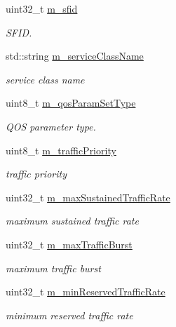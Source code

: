 \begin{DoxyCompactItemize}
\item 
uint32\+\_\+t \hyperlink{classns3_1_1ServiceFlow_ae39adff3ec14a28fc308208e56de4f82}{m\+\_\+sfid}
\begin{DoxyCompactList}\small\item\em S\+F\+ID. \end{DoxyCompactList}\item 
std\+::string \hyperlink{classns3_1_1ServiceFlow_a1edc6872551d75cf65513464475539b1}{m\+\_\+service\+Class\+Name}
\begin{DoxyCompactList}\small\item\em service class name \end{DoxyCompactList}\item 
uint8\+\_\+t \hyperlink{classns3_1_1ServiceFlow_a76222bd599cc4e27578bafba5304d158}{m\+\_\+qos\+Param\+Set\+Type}
\begin{DoxyCompactList}\small\item\em Q\+OS parameter type. \end{DoxyCompactList}\item 
uint8\+\_\+t \hyperlink{classns3_1_1ServiceFlow_a536ed647361dd0cc432aec5b4a6d661a}{m\+\_\+traffic\+Priority}
\begin{DoxyCompactList}\small\item\em traffic priority \end{DoxyCompactList}\item 
uint32\+\_\+t \hyperlink{classns3_1_1ServiceFlow_a604d5dcda6dbb58528799cf439584ecb}{m\+\_\+max\+Sustained\+Traffic\+Rate}
\begin{DoxyCompactList}\small\item\em maximum sustained traffic rate \end{DoxyCompactList}\item 
uint32\+\_\+t \hyperlink{classns3_1_1ServiceFlow_a6d99ed08420605f4f56188eced87ccd0}{m\+\_\+max\+Traffic\+Burst}
\begin{DoxyCompactList}\small\item\em maximum traffic burst \end{DoxyCompactList}\item 
uint32\+\_\+t \hyperlink{classns3_1_1ServiceFlow_a54dc771349ed7d93631e4a44299838d7}{m\+\_\+min\+Reserved\+Traffic\+Rate}
\begin{DoxyCompactList}\small\item\em minimum reserved traffic rate \end{DoxyCompactList}\item 

\end{DoxyCompactItemize}
